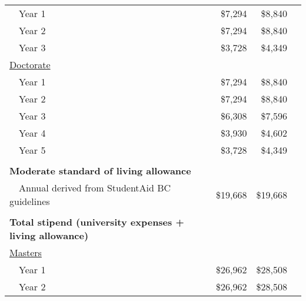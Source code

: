 \documentclass[11pt]{article}
\begin{document}
\begin{center}
\begin{tabular}{lrrr}
		~~Year 1                                                        & \$7,294           & \$8,840                  \\
		~~Year 2                                                        & \$7,294           & \$8,840                  \\
		~~Year 3                                                        & \$3,728           & \$4,349                  \\
		\underline{Doctorate}                                           &                   &                          \\
		~~Year 1                                                        & \$7,294           & \$8,840                  \\
		~~Year 2                                                        & \$7,294           & \$8,840                  \\
		~~Year 3                                                        & \$6,308           & \$7,596                  \\
		~~Year 4                                                        & \$3,930           & \$4,602                  \\
		~~Year 5                                                        & \$3,728           & \$4,349                  \\
		                                                                &                   &                        & \\
		\textbf{Moderate standard of living allowance}                  &                   &                          \\
		~~Annual derived from StudentAid BC guidelines                  & \$19,668          & \$19,668                 \\
		                                                                &                   &                        & \\
		\textbf{Total stipend (university expenses + living allowance)} &                   &                          \\
		\underline{Masters}                                             &                   &                          \\
		~~Year 1                                                        & \$26,962          & \$28,508                 \\
		~~Year 2                                                        & \$26,962          & \$28,508                 \\

\end{tabular}
\end{center}
\end{document}
